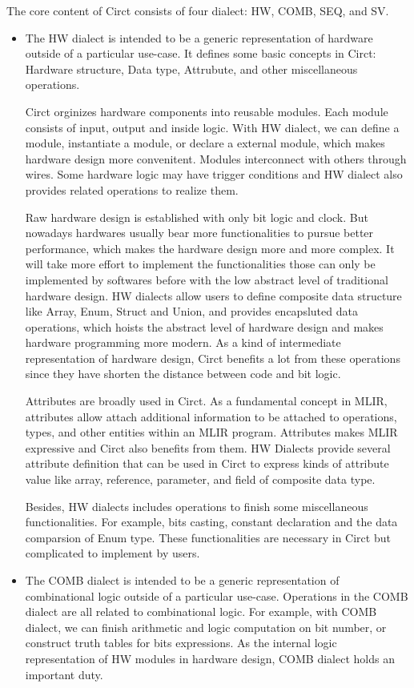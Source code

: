 The core content of Circt consists of four dialect: HW, COMB, SEQ, and SV.
\begin{itemize}
    \item The HW dialect is intended to be a generic representation of hardware outside of a particular use-case. It defines some basic concepts in Circt: Hardware structure, Data type, Attrubute, and other miscellaneous operations.

    Circt orginizes hardware components into reusable modules. Each module consists of input, output and inside logic. With HW dialect, we can define a module, instantiate a module, or declare a external module, which makes hardware design more convenitent. Modules interconnect with others through wires. Some hardware logic may have trigger conditions and HW dialect also provides related operations to realize them.
    
    Raw hardware design is established with only bit logic and clock. But nowadays hardwares usually bear more functionalities to pursue better performance, which makes the hardware design more and more complex. It will take more effort to implement the functionalities those can only be implemented by softwares before with the low abstract level of traditional hardware design.
    HW dialects allow users to define composite data structure like Array, Enum, Struct and Union, and provides encapsluted data operations, which hoists the abstract level of hardware design and makes hardware programming more modern. As a kind of intermediate representation of hardware design, Circt benefits a lot from these operations since they have shorten the distance between code and bit logic.
    
    Attributes are broadly used in Circt. As a fundamental concept in MLIR, attributes allow attach additional information to be attached to operations, types, and other entities within an MLIR program. Attributes makes MLIR expressive and Circt also benefits from them. HW Dialects provide several attribute definition that can be used in Circt to express kinds of attribute value like array, reference, parameter, and  field of composite data type.

    Besides, HW dialects includes operations to finish some miscellaneous functionalities. For example, bits casting, constant declaration and the data comparsion of Enum type. These functionalities are necessary in Circt but complicated to implement by users.

    \item The COMB dialect is intended to be a generic representation of combinational logic outside of a particular use-case. Operations in the COMB dialect are all related to combinational logic. For example, with COMB dialect, we can finish arithmetic and logic computation on bit number, or construct truth tables for bits expressions.
    As the internal logic representation of HW modules in hardware design, COMB dialect holds an important duty.


\end{itemize}
